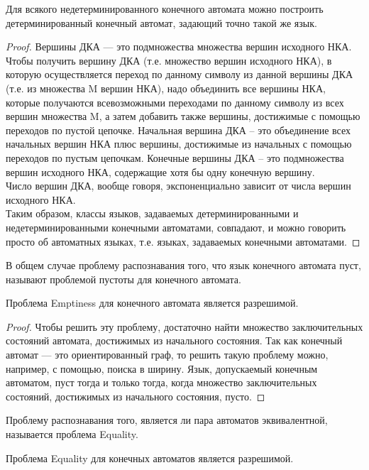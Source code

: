 
    \begin{Thm}
        Для всякого недетерминированного конечного автомата можно построить детерминированный конечный автомат, задающий точно такой же язык. 
    \end{Thm}
    \begin{proof}
        Вершины ДКА --- это подмножества множества вершин исходного НКА. Чтобы получить вершину ДКА (т.е. множество вершин исходного НКА), в которую осуществляется переход по данному символу из данной вершины ДКА (т.е. из множества M вершин НКА), надо объединить все вершины НКА, которые получаются всевозможными переходами по данному символу из всех вершин множества M, а затем добавить также вершины, достижимые с помощью переходов по пустой цепочке. Начальная вершина ДКА -- это объединение всех начальных вершин НКА плюс вершины, достижимые из начальных с помощью переходов по пустым цепочкам. Конечные вершины ДКА -- это подмножества вершин исходного НКА, содержащие хотя бы одну конечную вершину.\\
        Число вершин ДКА, вообще говоря, экспоненциально зависит от числа вершин исходного НКА.\\
        Таким образом, классы языков, задаваемых детерминированными и недетерминированными конечными автоматами, совпадают, и можно говорить просто об автоматных языках, т.е. языках, задаваемых конечными автоматами.
    \end{proof} 

    
    \begin{Def}
         В общем случае проблему распознавания того, что язык конечного автомата пуст, называют проблемой пустоты для конечного автомата. 
    \end{Def}
    \begin{Thm}
        Проблема Emptiness для конечного автомата является разрешимой.
    \end{Thm}
    \begin{proof}
        Чтобы решить эту проблему, достаточно найти множество заключительных состояний автомата, достижимых из начального состояния. Так как конечный автомат — это ориентированный граф, то решить такую проблему можно, например, с помощью, поиска в ширину. Язык, допускаемый конечным автоматом, пуст тогда и только тогда, когда множество заключительных состояний, достижимых из начального состояния, пусто.
    \end{proof}
    \begin{Def}
        Проблему распознавания того, является ли пара автоматов эквивалентной, называется проблема Equality.
    \end{Def}
    \begin{Thm}
        Проблема Equality для конечных автоматов является разрешимой.
    \end{Thm}

